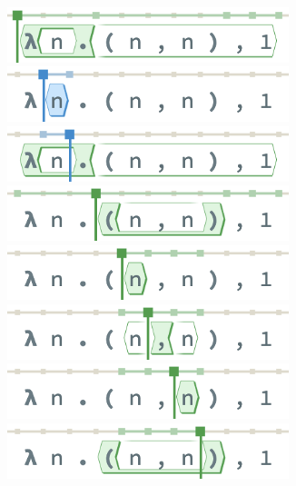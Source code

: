 \begin{figure}
   \begin{subfigure}[c]{0.25\textwidth}
      \centering
      \includegraphics[width=0.9\textwidth]{img/pan-terms-0.png}
      \includegraphics[width=0.9\textwidth]{img/pan-terms-1.png}
      \includegraphics[width=0.9\textwidth]{img/pan-terms-2.png}
      \includegraphics[width=0.9\textwidth]{img/pan-terms-3.png}
      \includegraphics[width=0.9\textwidth]{img/pan-terms-4.png}
      \includegraphics[width=0.9\textwidth]{img/pan-terms-5.png}
      \includegraphics[width=0.9\textwidth]{img/pan-terms-6.png}
      \includegraphics[width=0.9\textwidth]{img/pan-terms-7.png}

\end{subfigure}
\end{figure}
